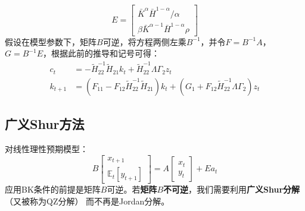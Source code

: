 \begin{example}
\[    \]
    \[
        E = 
        \begin{bmatrix}
            \bar{K}^\alpha \bar{H}^{1-\alpha} / \alpha \\
            \beta \bar{K}^{\alpha-1}\bar{H}^{1-\alpha}\rho
        \end{bmatrix}
    \]
    假设在模型参数下，矩阵$B$可逆，将方程两侧左乘$B^{-1}$，并令$F=B^{-1}A$，$G = B^{-1}E$，根据此前的推导和记号可得：
    \begin{equation*}
        \begin{aligned}
            c_t &= -\tilde{H}_{22}^{-1} \tilde{H}_{21} k_t+\tilde{H}_{22}^{-1} \Lambda \Gamma_2 z_t \\
            k_{t+1} &= \left(F_{11}-F_{12} \tilde{H}_{22}^{-1} \tilde{H}_{21}\right) k_t + 
                \left(G_1+F_{12} \tilde{H}_{22}^{-1} \Lambda \Gamma_2\right) z_t
        \end{aligned}
    \end{equation*}
\end{example}


\subsection{广义Shur方法}

对线性理性预期模型：
\begin{equation*}
        B
        \begin{bmatrix}
            x_{t+1} \\
            \mathbb{E}_t[y_{t+1}]
        \end{bmatrix}
        =
        A
        \begin{bmatrix}
            x_t \\
            y_t
        \end{bmatrix}
        + E a_t
    \end{equation*}
应用BK条件的前提是矩阵$B$可逆。若\textbf{矩阵$B$不可逆}，我们需要利用\textbf{广义Shur分解}（又被称为QZ分解）
而不再是Jordan分解。